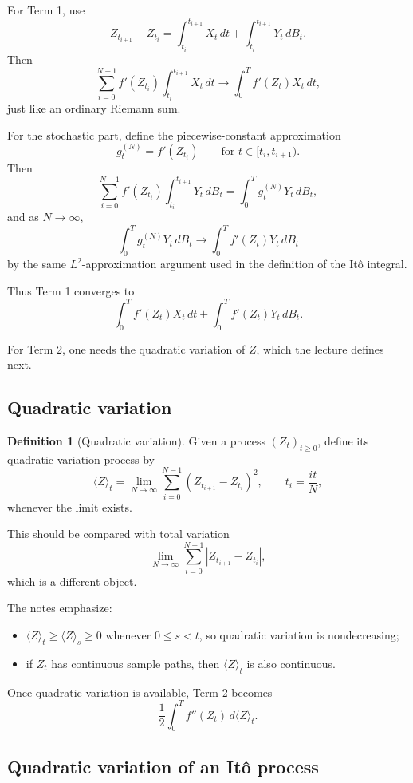 \documentclass[11pt]{article}
\theoremstyle{definition}
\newtheorem{definition}[theorem]{Definition}
\begin{document}
For Term 1, use
\[
Z_{t_{i+1}}-Z_{t_i}
=
\int_{t_i}^{t_{i+1}} X_t\,dt
+
\int_{t_i}^{t_{i+1}} Y_t\,dB_t.
\]
Then
\[
\sum_{i=0}^{N-1} f'(Z_{t_i})\int_{t_i}^{t_{i+1}} X_t\,dt
\to
\int_0^T f'(Z_t)X_t\,dt,
\]
just like an ordinary Riemann sum.

For the stochastic part, define the piecewise-constant approximation
\[
g_t^{(N)}=f'(Z_{t_i})
\qquad \text{for } t\in[t_i,t_{i+1}).
\]
Then
\[
\sum_{i=0}^{N-1} f'(Z_{t_i})\int_{t_i}^{t_{i+1}} Y_t\,dB_t
=
\int_0^T g_t^{(N)}Y_t\,dB_t,
\]
and as \(N\to\infty\),
\[
\int_0^T g_t^{(N)}Y_t\,dB_t
\to
\int_0^T f'(Z_t)Y_t\,dB_t
\]
by the same \(L^2\)-approximation argument used in the definition of the It\^o integral.

Thus Term 1 converges to
\[
\int_0^T f'(Z_t)X_t\,dt
+
\int_0^T f'(Z_t)Y_t\,dB_t.
\]

For Term 2, one needs the quadratic variation of \(Z\), which the lecture defines next.

\subsection{Quadratic variation}

\begin{definition}[Quadratic variation]
Given a process \((Z_t)_{t\ge 0}\), define its quadratic variation process by
\[
\langle Z\rangle_t
=
\lim_{N\to\infty}
\sum_{i=0}^{N-1}(Z_{t_{i+1}}-Z_{t_i})^2,
\qquad
t_i=\frac{it}{N},
\]
whenever the limit exists.
\end{definition}

This should be compared with total variation
\[
\lim_{N\to\infty}\sum_{i=0}^{N-1}|Z_{t_{i+1}}-Z_{t_i}|,
\]
which is a different object.

The notes emphasize:
\begin{itemize}[leftmargin=2em]
    \item \(\langle Z\rangle_t\ge \langle Z\rangle_s\ge 0\) whenever \(0\le s<t\), so quadratic variation is nondecreasing;
    \item if \(Z_t\) has continuous sample paths, then \(\langle Z\rangle_t\) is also continuous.
\end{itemize}

Once quadratic variation is available, Term 2 becomes
\[
\frac12\int_0^T f''(Z_t)\,d\langle Z\rangle_t.
\]

\subsection{Quadratic variation of an It\^o process}
\end{document}
